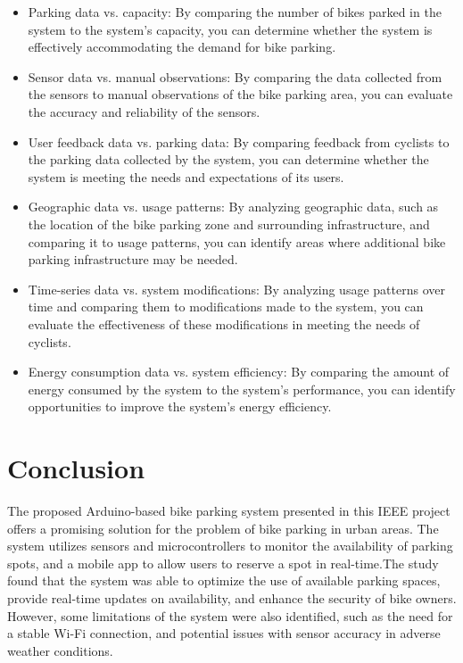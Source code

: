 \documentclass[conference]{IEEEtran}
\begin{document}
	 	\begin{itemize}
	 	\item Parking data vs. capacity: 
	 	By comparing the number of bikes parked in the system to the system's capacity, you can determine whether the system is effectively accommodating the demand for bike parking.
	 	\item Sensor data vs. manual observations: 
	 	By comparing the data collected from the sensors to manual observations of the bike parking area, you can evaluate the accuracy and reliability of the sensors.
	 	\item User feedback data vs. parking data: 
	 	By comparing feedback from cyclists to the parking data collected by the system, you can determine whether the system is meeting the needs and expectations of its users.
	 	\item Geographic data vs. usage patterns: 
	 	By analyzing geographic data, such as the location of the bike parking zone and surrounding infrastructure, and comparing it to usage patterns, you can identify areas where additional bike parking infrastructure may be needed.\cite{b6}
	 	\item Time-series data vs. system modifications: 
	 	By analyzing usage patterns over time and comparing them to modifications made to the system, you can evaluate the effectiveness of these modifications in meeting the needs of cyclists. 	
	 	\item Energy consumption data vs. system efficiency:
	 	By comparing the amount of energy consumed by the system to the system's performance, you can identify opportunities to improve the system's energy efficiency.
	 \end{itemize}
	 
\section{Conclusion}
	The proposed Arduino-based bike parking system presented in this IEEE project offers a promising solution for the problem of bike parking in urban areas. The system utilizes sensors and microcontrollers to monitor the availability of parking spots, and a mobile app to allow users to reserve a spot in real-time.The study found that the system was able to optimize the use of available parking spaces, provide real-time updates on availability, and enhance the security of bike owners. However, some limitations of the system were also identified, such as the need for a stable Wi-Fi connection, and potential issues with sensor accuracy in adverse weather conditions.
		
\end{document}
